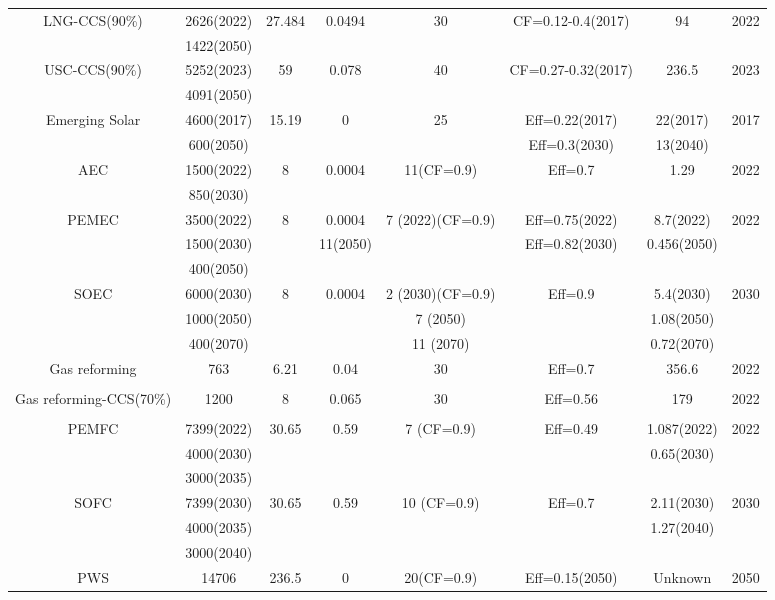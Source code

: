 \begin{landscape}
\begin{longtable}{ |*{8}{c|} }
LNG-CCS(90\%) & 2626(2022) & 27.484 & 0.0494 & 30 & CF=0.12-0.4(2017) & 94 & 2022 \\
 \cite{eia_cost_2020,ipcc_climate_2014} & 1422(2050) &  & &  &  &  & \\
USC-CCS(90\%) & 5252(2023) & 59 & 0.078 & 40 & CF=0.27-0.32(2017) & 236.5 & 2023 \\
 \cite{eia_cost_2020,ipcc_climate_2014} & 4091(2050) &  &  &  &  &  & \\
Emerging Solar & 4600(2017) & 15.19 & 0 & 25 & Eff=0.22(2017) & 22(2017) & 2017 \\
 \cite{irena_solar_2012,peng_review_2013} & 600(2050) &  &  &  &Eff=0.3(2030)  & 13(2040) &  \\
\gls{AEC}  & 1500(2022) & 8 & 0.0004 & 11(CF=0.9) & Eff=0.7 & 1.29 & 2022\\
\cite{iea_technology_2015, bhandari_life_2014, cetinkaya_life_2012, burkhardt_hydrogen_2016} & 850(2030) &  &  &  &  & &  \\
\gls{PEMEC} & 3500(2022) & 8 & 0.0004 & 7 (2022)(CF=0.9) & Eff=0.75(2022) & 8.7(2022) & 2022\\
\cite{iea_technology_2015, bareis_life_2019, carmo_comprehensive_2013,ayers_research_2010,siracusano_influence_2017,schmidt_future_2017,mayyas_manufacturing_2019} & 1500(2030) &  & 11(2050)  &  & Eff=0.82(2030) & 0.456(2050)  &  \\
 & 400(2050) &  &  &  & &  &  \\
\gls{SOEC} & 6000(2030) & 8 & 0.0004 & 2 (2030)(CF=0.9) & Eff=0.9 & 5.4(2030) & 2030\\
\cite{iea_technology_2015,schmidt_future_2017,hafele_life_2016} & 1000(2050) &  &  & 7 (2050) &  & 1.08(2050) & \\
 & 400(2070) &  &  & 11 (2070) &  & 0.72(2070) & \\
Gas reforming  & 763 & 6.21 & 0.04 & 30  & Eff=0.7 & 356.6 & 2022\\
\cite{iea_technology_2015,mehmeti_life_2018,keipi_economic_2018} & & & & & &  & \\
Gas reforming-CCS(70\%) & 1200 & 8 & 0.065 & 30 & Eff=0.56 & 179 & 2022\\
\cite{iea_technology_2015,keipi_economic_2018,cormos_ana-maria_economic_2018} &  &  &  &  &  &  & \\
\gls{PEMFC} \cite{iea_technology_2015,simons_life-cycle_2015,kannan_life_2007} & 7399(2022) & 30.65 & 0.59 & 7 (CF=0.9) & Eff=0.49 & 1.087(2022) & 2022\\
 & 4000(2030) &  &  &  &  & 0.65(2030) &  \\
 & 3000(2035) &  &  &  &  &  &  \\
\gls{SOFC} \cite{iea_technology_2015,simons_life-cycle_2015,rillo_life_2017,tu_advances_2004} & 7399(2030) & 30.65 & 0.59 & 10 (CF=0.9) & Eff=0.7 & 2.11(2030) & 2030\\
 & 4000(2035) &  &  &  &  & 1.27(2040) &  \\
 & 3000(2040) &  &  &  &  & &  \\
\gls{PWS} \cite{pinaud_technical_2013} & 14706  & 236.5 & 0 & 20(CF=0.9) & Eff=0.15(2050) & Unknown & 2050
\label{eco}
\end{longtable}
\end{landscape}
